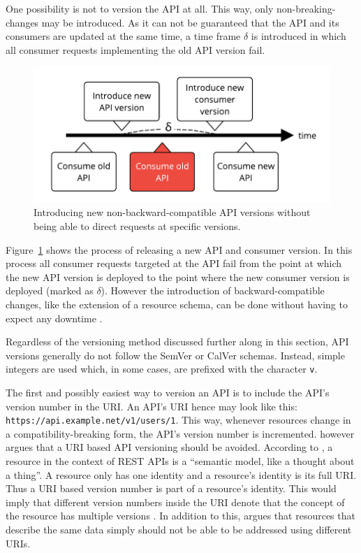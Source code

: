 One possibility is not to version the \ac{API} at all. This way, only
non-breaking-changes may be introduced. As it can not be guaranteed that the
\ac{API} and its consumers are updated at the same time, a time frame $\delta$
is introduced in which all consumer requests implementing the old \ac{API}
version fail.

\begin{figure}[H]
\begin{center}
  \includegraphics[scale=0.7]{images/figures/api_releases.pdf}
\end{center}
\caption{Introducing new non-backward-compatible \ac{API} versions without being able to direct requests at specific versions.}%
\label{fig:api_releases}
\end{figure}

Figure~\ref{fig:api_releases} shows the process of releasing a new \ac{API} and
consumer version. In this process all consumer requests targeted at the
\ac{API} fail from the point at which the new \ac{API} version is deployed to
the point where the new consumer version is deployed (marked as $\delta$).
However the introduction of backward-compatible changes, like the extension of
a resource schema, can be done without having to expect any downtime
\autocite{MicrosoftAPIdesign2018}.

Regardless of the versioning method discussed further along in this section,
\ac{API} versions generally do not follow the SemVer or CalVer schemas.
Instead, simple integers are used which, in some cases, are prefixed with the
character \texttt{v}.

The first and possibly easiest way to version an \ac{API} is to include the
\ac{API}'s version number in the \ac{URI}. An \ac{API}'s \ac{URI} hence may
look like this: \texttt{https://api.example.net/v1/users/1}. This way, whenever
resources change in a compatibility-breaking form, the \ac{API}'s version
number is incremented. \autocite[Ch. 6]{MasseRESTAPIDesign2011} however argues
that a \ac{URI} based \ac{API} versioning should be avoided. According to
\autocite{MasseRESTAPIDesign2011}, a resource in the context of \ac{REST}
\acp{API} is a \enquote{semantic model, like a thought about a thing}.
A resource only has one identity and a resource's identity
is its full \ac{URI}. Thus a \ac{URI} based version number is part of a
resource's identity. This would imply that different version numbers inside the
\ac{URI} denote that the concept of the resource has multiple versions
\autocite[Ch. 6]{MasseRESTAPIDesign2011}. In addition to this,
\autocite{MicrosoftAPIdesign2018} argues that resources that describe the same
data simply should not be able to be addressed using different \acp{URI}.

